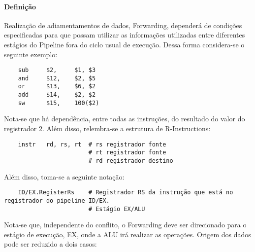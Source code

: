 \documentclass{article}
\begin{document}
\paragraph{Definição}Realização de adiamentamentos de dados, Forwarding, dependerá de condições especificadas para que possam utilizar as informações utilizadas entre diferentes estágios do Pipeline fora do ciclo usual de execução. Dessa forma considera-se o seguinte exemplo:
\begin{scriptsize}
    \myStyleRISCV
    \begin{lstlisting}
    sub     $2,     $1, $3
    and     $12,    $2, $5
    or      $13,    $6, $2
    add     $14,    $2, $2
    sw      $15,    100($2)
    \end{lstlisting}
\end{scriptsize}
\noindent Nota-se que há dependência, entre todas as instruções, do resultado do valor do registrador 2. Além disso, relembra-se a estrutura de R-Instructions:
\begin{scriptsize}
    \myStyleRISCV
    \begin{lstlisting}
    instr   rd, rs, rt  # rs registrador fonte
                        # rt registrador fonte
                        # rd registrador destino
    \end{lstlisting}
\end{scriptsize}
\noindent Além disso, toma-se a seguinte notação:
\begin{scriptsize}
    \myStyleRISCV
    \begin{lstlisting}
    ID/EX.RegisterRs    # Registrador RS da instrução que está no registrador do pipeline ID/EX.
                        # Estágio EX/ALU
    \end{lstlisting}
\end{scriptsize}
\noindent Nota-se que, independente do conflito, o Forwarding deve ser direcionado para o estágio de execução, EX, onde a ALU irá realizar as operações. Origem dos dados pode ser reduzido a dois casos:
\end{document}
